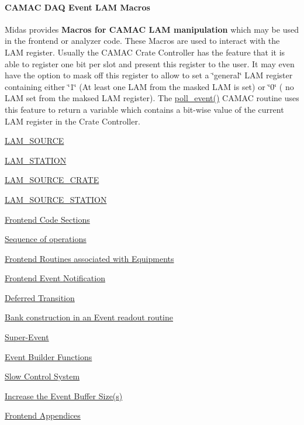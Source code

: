 \label{Frontend_code_idx_CAMAC_LAM-macro}
\hypertarget{Frontend_code_idx_CAMAC_LAM-macro}{}
\hypertarget{Frontend_code_FE_LAM_macros}{}\paragraph{CAMAC DAQ Event LAM Macros}\label{Frontend_code_FE_LAM_macros}
Midas provides {\bfseries  Macros for CAMAC LAM manipulation } which may be used in the frontend or analyzer code. These Macros are used to interact with the LAM register. Usually the CAMAC Crate Controller has the feature that it is able to register one bit per slot and present this register to the user. It may even have the option to mask off this register to allow to set a \char`\"{}general\char`\"{} LAM register containing either \char`\"{}1\char`\"{} (At least one LAM from the masked LAM is set) or \char`\"{}0\char`\"{} ( no LAM set from the maksed LAM register). The \hyperlink{FE_eq_event_routines_FE_poll_event}{poll\_\-event()} CAMAC routine uses this feature to return a variable which contains a bit-\/wise value of the current LAM register in the Crate Controller.
\begin{DoxyItemize}
\item \hyperlink{group__midasincludecode_ga93fde3913a488880c4f96267e24579ee}{LAM\_\-SOURCE}
\item \hyperlink{group__midasincludecode_ga479219e07f43223f74ff8638705a804e}{LAM\_\-STATION}
\item \hyperlink{group__midasincludecode_gafac465450c8035c37ba5482970e026eb}{LAM\_\-SOURCE\_\-CRATE}
\item \hyperlink{group__midasincludecode_gae70f372186346224788f2980de071736}{LAM\_\-SOURCE\_\-STATION}
\end{DoxyItemize}






\begin{DoxyItemize}
\item \hyperlink{FE_code_sections}{Frontend Code Sections}
\item \hyperlink{FE_sequence}{Sequence of operations}
\item \hyperlink{FE_eq_event_routines}{Frontend Routines associated with Equipments}
\item \hyperlink{FE_event_notification}{Frontend Event Notification}
\item \hyperlink{FE_event_notification_FE_Deferred_Transition}{Deferred Transition}
\item \hyperlink{FE_bank_construction}{Bank construction in an Event readout routine}
\item \hyperlink{FE_Super_Event}{Super-\/Event}
\item \hyperlink{FE_Event_Builder}{Event Builder Functions}
\item \hyperlink{FE_Slow_Control_system}{Slow Control System}
\begin{DoxyItemize}
\item \hyperlink{FE_event_buffer_size}{Increase the Event Buffer Size(s)}
\item \hyperlink{FE_Appendices}{Frontend Appendices}
\end{DoxyItemize}
\end{DoxyItemize}


